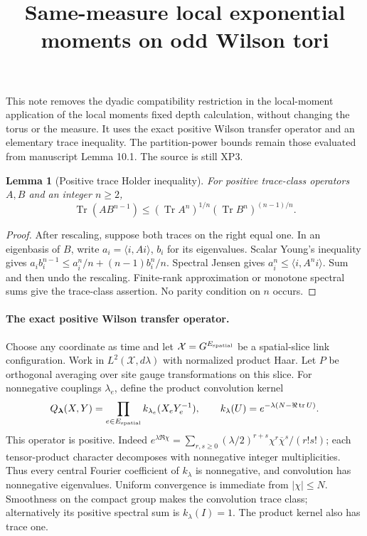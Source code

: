 \documentclass[11pt]{article}
\title{Same-measure local exponential moments on odd Wilson tori}\author{}\date{}
\newtheorem{lemma}{Lemma}
\newcommand{\Tr}{\operatorname{Tr}}
\begin{document}
\maketitle
This note removes the dyadic compatibility restriction in the local-moment application of
the local moments fixed depth calculation, without changing the torus or the measure. It uses the exact positive Wilson
transfer operator and an elementary trace inequality. The partition-power bounds remain
those evaluated from manuscript Lemma 10.1. The source is still XP3.

\begin{lemma}[Positive trace Holder inequality]
For positive trace-class operators $A,B$ and an integer $n\ge2$,
\[
 \Tr(AB^{n-1})\le(\Tr A^n)^{1/n}(\Tr B^n)^{(n-1)/n}.
\]
\end{lemma}
\begin{proof}
After rescaling, suppose both traces on the right equal one. In an eigenbasis of $B$,
write $a_i=\langle i,Ai\rangle$, $b_i$ for its eigenvalues. Scalar Young's inequality gives
$a_ib_i^{n-1}\le a_i^n/n+(n-1)b_i^n/n$.
Spectral Jensen gives $a_i^n\le\langle i,A^ni\rangle$. Sum and then undo the rescaling.
Finite-rank approximation or monotone spectral sums give the trace-class assertion.
No parity condition on $n$ occurs.
\end{proof}

\paragraph{The exact positive Wilson transfer operator.}
Choose any coordinate as time and let $\mathcal X=G^{E_{\rm spatial}}$ be a spatial-slice
link configuration. Work in $L^2(\mathcal X,d\lambda)$ with normalized product Haar.
Let $P$ be orthogonal averaging over site gauge transformations on this slice.
For nonnegative couplings $\lambda_e$, define the product convolution kernel
\[
 Q_{\boldsymbol\lambda}(X,Y)=\prod_{e\in E_{\rm spatial}}
 k_{\lambda_e}(X_eY_e^{-1}),\qquad
 k_\lambda(U)=e^{-\lambda(N-\Re\operatorname{tr}U)}.
\]
This operator is positive. Indeed
$e^{\lambda\Re\chi}=\sum_{r,s\ge0}(\lambda/2)^{r+s}\chi^r\overline\chi^s/(r!s!)$;
each tensor-product character decomposes with nonnegative integer multiplicities.
Thus every central Fourier coefficient of $k_\lambda$ is nonnegative, and convolution
has nonnegative eigenvalues. Uniform convergence is immediate from $|\chi|\le N$.
Smoothness on the compact group makes the convolution trace class; alternatively its
positive spectral sum is $k_\lambda(I)=1$. The product kernel also has trace one.
\end{document}
